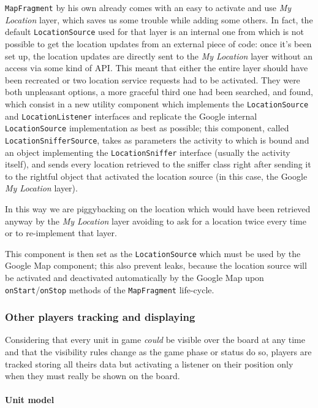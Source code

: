 			\lstinline|MapFragment| by his own already comes with an easy to activate and use \emph{My Location} layer, which saves us some trouble while adding some others.
			In fact, the default \lstinline|LocationSource| used for that layer is an internal one from which is not possible to get the location updates from an external piece of code: once it's been set up, the location updates are directly sent to the \emph{My Location} layer without an access via some kind of API.
			This meant that either the entire layer should have been recreated or two location service requests had to be activated. They were both unpleasant options, a more graceful third one had been searched, and found, which consist in a new utility component which implements the \lstinline|LocationSource| and \lstinline|LocationListener| interfaces and replicate the Google internal \lstinline|LocationSource| implementation as best as possible; this component, called \lstinline|LocationSnifferSource|, takes as parameters the activity to which is bound and an object implementing the \lstinline|LocationSniffer| interface (usually the activity itself), and sends every location retrieved to the sniffer class right after sending it to the rightful object that activated the location source (in this case, the Google \emph{My Location} layer).
			
			In this way we are piggybacking on the location which would  have been retrieved anyway by the \emph{My Location} layer avoiding to ask for a location twice every time or to re-implement that layer.
			
			This component is then set as the \lstinline|LocationSource| which must be used by the Google Map component; this also prevent leaks, because the location source will be activated and deactivated automatically by the Google Map upon \lstinline|onStart|/\lstinline|onStop| methods of the \lstinline|MapFragment| life-cycle.
			
			\subsubsection{Other players tracking and displaying}
			
			Considering that every unit in game \emph{could} be visible over the board at any time and that the visibility rules change as the game phase or status do so, players are tracked storing all theirs data but activating a listener on their position only when they must really be shown on the board.
			
				\paragraph{Unit model}
					
